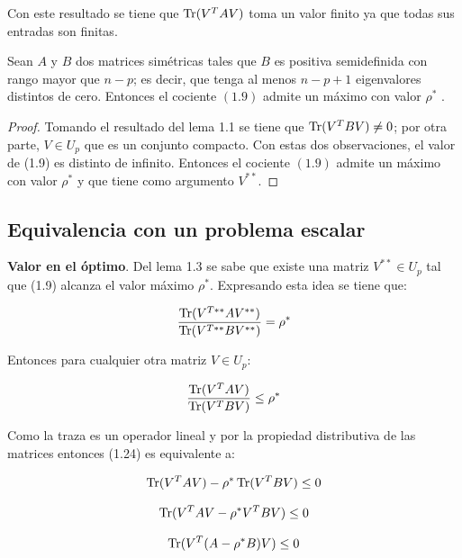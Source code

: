 Con este resultado se tiene que $\operatorname{Tr}(V^T A V)$ toma un valor finito ya que todas sus entradas son finitas. 


\begin{lemma}\label{lemma2.5}
Sean $A$ y $B$ dos matrices simétricas tales que $B$ es positiva semidefinida con rango mayor que $n-p$; es decir, que tenga al menos $n-p+1$ eigenvalores distintos de cero. Entonces el cociente $(1.9)$ admite un máximo con valor $\rho^*$ \cite{ngo2012trace}.
\end{lemma}

\begin{proof}
Tomando el resultado del lema 1.1 se tiene que $\operatorname{Tr}(V^T B V) \neq 0$; por otra parte, $V \in U_p$ que es un conjunto compacto. Con estas dos observaciones, el valor de (1.9) es distinto de infinito. Entonces el cociente $(1.9)$ admite un máximo con valor $\rho^*$ y que tiene como argumento $V^{**}$.
\end{proof}

\subsection{Equivalencia con un problema escalar}

\textbf{Valor en el óptimo}. Del lema 1.3 se sabe que existe una matriz $V^{**} \in U_p$ tal que (1.9) alcanza el valor máximo $\rho^*$. Expresando esta idea se tiene que:

\begin{equation} \label{eq:2.24}
 \frac{\operatorname{Tr}(V^{T**} A V^{**})}{\operatorname{Tr}(V^{T**} B V^{**})} = \rho^* 
\end{equation}

Entonces para cualquier otra matriz $V \in U_p $:

\begin{equation}\label{eq:2.25}
 \frac{\operatorname{Tr}(V^T A V)}{\operatorname{Tr}(V^T B V)} \leq \rho^* 
\end{equation}

Como la traza es un operador lineal y por la propiedad distributiva de las matrices entonces (1.24) es equivalente a:

\begin{equation*}
 \operatorname{Tr}(V^T A V)- \rho^* \operatorname{Tr}(V^T B V) \leq 0 
\end{equation*}

\begin{equation*}
	\operatorname{Tr}(V^T A V- \rho^* V^T B V) \leq 0	
 \end{equation*}

 \begin{equation} \label{eq:2.26}
	\operatorname{Tr}(V^T (A - \rho^* B )V) \leq 0	
 \end{equation}

